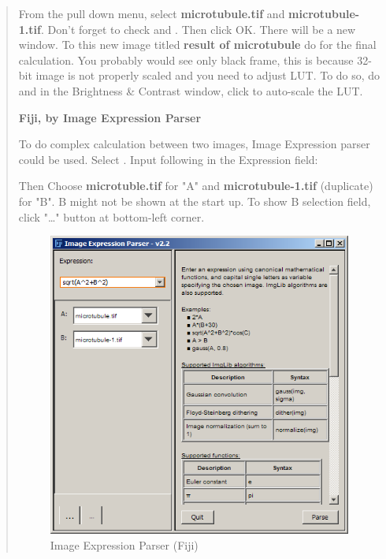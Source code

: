 \begin{indentexercise}{1}
\begin{quote}
From the pull down menu, select \textbf{microtubule.tif} and \textbf{microtubule-1.tif}. Don't forget to check  and . Then click OK.
There will be a new window. To this new image titled \textbf{result of microtubule} do
 for the final calculation. 
You probably would see only black frame, this is
because 32-bit image is not properly scaled and you need to adjust LUT.
To do so, do 
and in the Brightness \& Contrast window, click  to auto-scale the LUT.


\textbf{Fiji, by Image Expression Parser}

To do complex calculation between two images, Image Expression
parser could be used. Select . Input
following in the Expression field:



Then Choose \textbf{microtuble.tif} for "A"
and \textbf{microtubule-1.tif} (duplicate) for
"B". B might not be shown at the
start up. To show B selection field, click
"\ldots" button at bottom-left corner.
\begin{figure}[htbp]
\begin{center}
\includegraphics[width=10cm]{fig/CMCIBasicCourse201102-img111.png}
\caption{ Image Expression Parser (Fiji)}
\label{fig:ImageExpressionParser}
\end{center}
\end{figure}

\end{quote}


\end{indentexercise}
